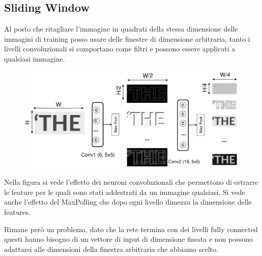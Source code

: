 \subsection{Sliding Window}
Al posto che ritagliare l'immagine in quadrati della stessa dimensione delle immagini di training posso usare delle finestre di dimensione arbitraria, tanto i livelli convoluzionali si comportano come filtri e possono essere applicati a qualsiasi immagine.

\begin{figure}
	\vspace{-.25cm}
	\centering
	\includegraphics[width=\linewidth]{Picture/Sliding_Window_LeNet_5}
\end{figure}
Nella figura si vede l'effetto dei neuroni convoluzionali che permettono di estrarre le feature per le quali sono stati addestrati da un immagine qualsiasi. Si vede anche l'effetto del MaxPolling che dopo ogni livello dimezza la dimensione delle features. 

Rimane però un problema, dato che la rete termina con dei livelli fully connected questi hanno bisogno di un vettore di input di dimensione fissata e non possono adattarsi alle dimensioni della finestra arbitraria che abbiamo scelto.

